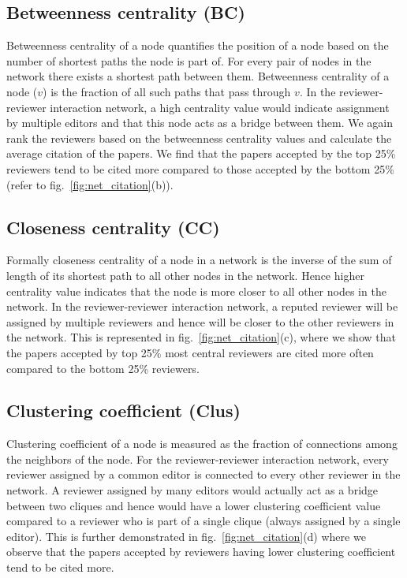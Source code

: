 \subsection{Betweenness centrality (BC)}

Betweenness centrality of a node quantifies the position of a node based on the number of shortest paths the node is part of. For every  pair of nodes in the network there exists a shortest path between them. Betweenness centrality of a node ($v$) is the fraction of all such paths that pass through $v$. In the reviewer-reviewer interaction network, a high  centrality value would indicate assignment by multiple editors and that this node acts as a bridge between them. We again rank the reviewers based on the betweenness centrality values and calculate the average citation of the papers. We find that the papers accepted by the top 25\% reviewers tend to be cited more compared to those accepted by the bottom 25\% (refer to fig.~\ref{fig:net_citation}(b)). 

\subsection{Closeness centrality (CC)}

Formally closeness centrality of a node in a network is the inverse of the sum of length of its shortest path to all other nodes in the network. Hence higher centrality value indicates that the node is more closer to all other nodes in the network. In the reviewer-reviewer interaction network, a reputed reviewer will be assigned by multiple reviewers and hence will be closer to the other reviewers in the network. This is represented in fig.~\ref{fig:net_citation}(c), where we show that the papers accepted by top 25\% most central reviewers 
are cited more often compared to the bottom 25\% reviewers. 

\subsection{Clustering coefficient (Clus)}

Clustering coefficient of a node is measured as the fraction of connections among the neighbors of the node. For the reviewer-reviewer interaction network, every reviewer assigned by a common editor is connected to every other reviewer in the network. A reviewer assigned by many editors would actually act as a bridge between two cliques and hence would have a lower clustering coefficient value compared to a reviewer who is part of a single clique (always assigned by a single editor). This is further demonstrated in  fig.~\ref{fig:net_citation}(d) where we observe that the papers accepted by reviewers having lower clustering coefficient tend to be cited more.

